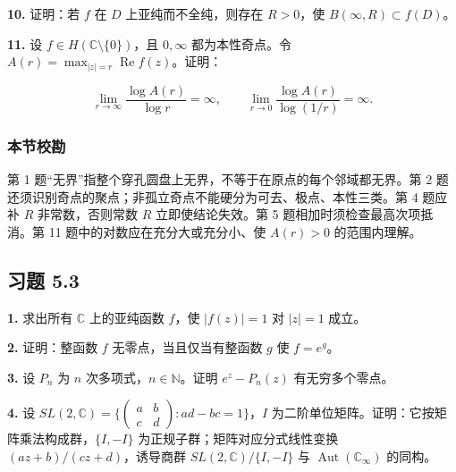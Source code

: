 \documentclass[11pt,a4paper]{article}
\begin{document}
\par{}
\noindent\textbf{10.} 证明：若 \(f\) 在 \(D\) 上亚纯而不全纯，则存在 \(R>0\)，使
\(B(\infty,R)\subset f(D)\)。

\par{}
\noindent\textbf{11.} 设 \(f\in H(\mathbb C\setminus\{0\})\)，且 \(0,\infty\)
都为本性奇点。令 \(A(r)=\max_{|z|=r}\operatorname{Re}f(z)\)。证明：

\[
\lim_{r\to\infty}\frac{\log A(r)}{\log r}=\infty,\qquad
\lim_{r\to0}\frac{\log A(r)}{\log(1/r)}=\infty.
\]

\subsubsection{本节校勘}\label{ch05-practice-ux672cux8282ux6821ux52d8-1}

第 1 题``无界''指整个穿孔圆盘上无界，不等于在原点的每个邻域都无界。第 2
题还须识别奇点的聚点；非孤立奇点不能硬分为可去、极点、本性三类。第 4
题应补 \(R\) 非常数，否则常数 \(R\) 立即使结论失效。第 5
题相加时须检查最高次项抵消。第 11 题中的对数应在充分大或充分小、使
\(A(r)>0\) 的范围内理解。

\subsection{习题 5.3}\label{ch05-practice-heading-3}

\par{}
\noindent\textbf{1.} 求出所有 \(\mathbb C\) 上的亚纯函数 \(f\)，使 \(|f(z)|=1\)
对 \(|z|=1\) 成立。

\par{}
\noindent\textbf{2.} 证明：整函数 \(f\) 无零点，当且仅当有整函数 \(g\) 使
\(f=e^g\)。

\par{}
\noindent\textbf{3.} 设 \(P_n\) 为 \(n\) 次多项式，\(n\in\mathbb N\)。证明
\(e^z-P_n(z)\) 有无穷多个零点。

\par{}
\noindent\textbf{4.} 设
\(SL(2,\mathbb C)=\{\left(\begin{smallmatrix}a&b\\c&d\end{smallmatrix}\right):ad-bc=1\}\)，\(I\)
为二阶单位矩阵。证明：它按矩阵乘法构成群，\(\{I,-I\}\)
为正规子群；矩阵对应分式线性变换 \((az+b)/(cz+d)\)，诱导商群
\(SL(2,\mathbb C)/\{I,-I\}\) 与 \(\operatorname{Aut}(\mathbb C_\infty)\)
的同构。
\end{document}

